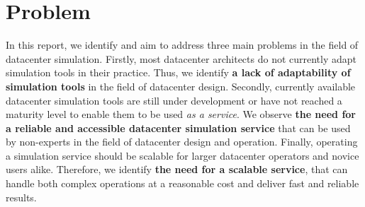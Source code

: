 \section{Problem} \label{sec:problem}


In this report, we identify and aim to address three main problems in the field of datacenter simulation.
Firstly, most datacenter architects do not currently adapt simulation tools in their practice.
Thus, we identify \textbf{a lack of adaptability of simulation tools} in the field of datacenter design.
Secondly, currently available datacenter simulation tools are still under development or have not reached a maturity level to enable them to be used \textit{as a service}.
We observe \textbf{the need for a reliable and accessible datacenter simulation service} that can be used by non-experts in the field of datacenter design and operation.
Finally, operating a simulation service should be scalable for larger datacenter operators and novice users alike.
Therefore, we identify \textbf{the need for a scalable service}, that can handle both complex operations at a reasonable cost and deliver fast and reliable results.

